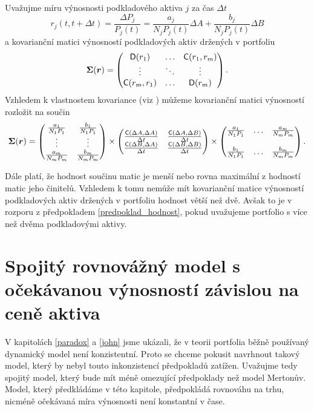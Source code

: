 \documentclass[a4paper,12pt]{report}
\theoremstyle{definition} \newtheorem{definice}[veta]{Definice}
\theoremstyle{remark}
\begin{document}
Uvažujme míru výnosnosti podkladového aktiva $j$ za čas $\Delta t$
\begin{displaymath}
r_j(t,t+\Delta t)=\frac{\Delta P_j}{P_j(t)}=\frac{a_j}{N_jP_j(t)}\Delta A + \frac{b_j}{N_jP_j(t)}\Delta B
\end{displaymath}
a kovarianční matici výnosností podkladových aktiv držených v portfoliu
$$\boldsymbol{\Sigma}(\boldsymbol{r})=
\begin{pmatrix}
\mathsf{D}(r_1)  & \ldots & \mathsf{C}(r_1,r_m)  \cr \vdots & \ddots & \vdots\cr \mathsf{C}(r_m,r_1)   & \ldots & \mathsf{D}(r_m) 
\end{pmatrix}.$$
Vzhledem k vlastnostem kovariance (viz \cite{andel}) můžeme kovarianční matici výnosností rozložit na součin 
$$
\boldsymbol{\Sigma}(\boldsymbol{r})= 
\begin{pmatrix}
\frac{a_1}{N_1P_1} & \frac{b_1}{N_1P_1}\cr \vdots & \vdots\cr \frac{a_m}{N_mP_m} & \frac{b_m}{N_mP_m}
\end{pmatrix}
\times
\begin{pmatrix}
\frac{\mathsf{C}(\Delta A, \Delta A)}{\Delta t} &
\frac{\mathsf{C}(\Delta A, \Delta B)}{\Delta t} \cr
\frac{\mathsf{C}(\Delta B, \Delta A)}{\Delta t} & \frac{\mathsf{C}(\Delta B,
\Delta B)}{\Delta t} 
\end{pmatrix}
\times
\begin{pmatrix}
\frac{a_1}{N_1P_1} & \ldots & \frac{a_m}{N_mP_m}\cr \cr \frac{b_1}{N_1P_1} & \ldots &
\frac{b_m}{N_mP_m}
\end{pmatrix}.
$$

Dále platí, že hodnost součinu matic je menší nebo rovna maximální z hodností matic jeho činitelů.
Vzhledem k tomu nemůže mít kovarianční matice výnosností podkladových aktiv držených v portfoliu hodnost větší než dvě.
Avšak to je v rozporu z předpokladem \ref{predpoklad_hodnost}, pokud uvažujeme portfolio s více než dvěma podkladovými aktivy.


\section{Spojitý rovnovážný model s očekávanou výnosností závislou na ceně aktiva }\label{muj_model}
V kapitolách \ref{paradox} a \ref{john} jsme ukázali, že v teorii portfolia běžně používaný dynamický model není konzistentní.
Proto se chceme pokusit navrhnout takový model, který by nebyl touto inkonzistencí předpokladů zatížen.
Uvažujme tedy spojitý model, který bude mít méně omezující předpoklady než model Mertonův.
Model, který předkládáme v této kapitole, předpokládá rovnováhu na trhu, nicméně očekávaná míra výnosnosti není konstantní v čase.
\end{document}
